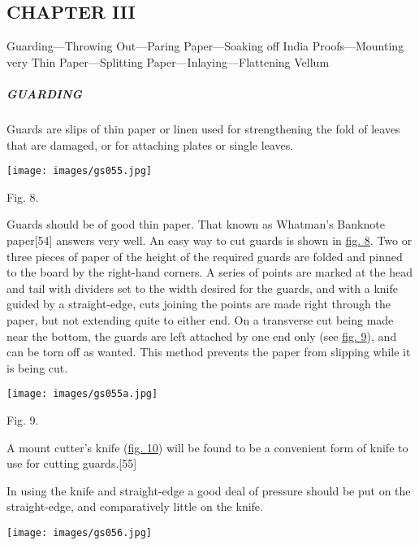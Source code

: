 \documentclass[
]{article}
\begin{document}
\hypertarget{chapter-iii}{%
\subsection[CHAPTER
III]{\texorpdfstring{\protect\hypertarget{CHAPTER_III}{}{}CHAPTER
III}{CHAPTER III}}\label{chapter-iii}}

Guarding---Throwing Out---Paring Paper---Soaking off India
Proofs---Mounting very Thin Paper---Splitting
Paper---Inlaying---Flattening Vellum

\hypertarget{guarding}{%
\subparagraph{GUARDING}\label{guarding}}

{Guards} are slips of thin paper or linen used for strengthening the
fold of leaves that are damaged, or for attaching plates or single
leaves.

\protect\hypertarget{Fig_8}{}{}
\texttt{[image: images/gs055.jpg]}

Fig. 8.

Guards should be of good thin paper. That known as Whatman's Banknote
paper{\protect\hypertarget{Page_54}{}{{[}54{]}}} answers very well. An
easy way to cut guards is shown in \protect\hyperlink{Fig_8}{fig. 8}.
Two or three pieces of paper of the height of the required guards are
folded and pinned to the board by the right-hand corners. A series of
points are marked at the head and tail with dividers set to the width
desired for the guards, and with a knife guided by a straight-edge, cuts
joining the points are made right through the paper, but not extending
quite to either end. On a transverse cut being made near the bottom, the
guards are left attached by one end only (see
\protect\hyperlink{Fig_9}{fig. 9}), and can be torn off as wanted. This
method prevents the paper from slipping while it is being cut.

\protect\hypertarget{Fig_9}{}{}
\texttt{[image: images/gs055a.jpg]}

Fig. 9.

A mount cutter's knife (\protect\hyperlink{Fig_10}{fig. 10}) will be
found to be a convenient form of knife to use for cutting
guards.{\protect\hypertarget{Page_55}{}{{[}55{]}}}

In using the knife and straight-edge a good deal of pressure should be
put on the straight-edge, and comparatively little on the knife.

\protect\hypertarget{Fig_10}{}{}
\texttt{[image: images/gs056.jpg]}
\end{document}

